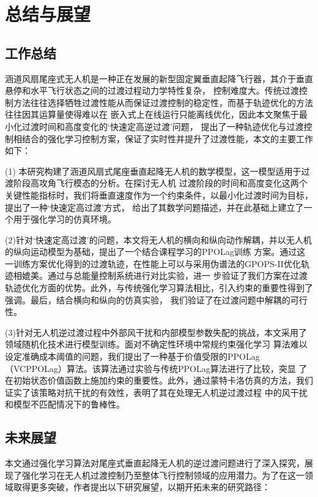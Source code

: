 \chapter{总结与展望}
\section{工作总结}
涵道风扇尾座式无人机是一种正在发展的新型固定翼垂直起降飞行器，其介于垂直悬停和水平飞行状态之间的过渡过程动力学特性复杂，
控制难度大。传统过渡控制方法往往选择牺牲过渡性能从而保证过渡控制的稳定性，而基于轨迹优化的方法往往因其运算量使得难以在
嵌入式上在线运行只能离线优化，因此本文聚焦于最小化过渡时间和高度变化的‘快速定高逆过渡’问题，
提出了一种轨迹优化与过渡控制相结合的强化学习控制方案，保证了实时性并提升了过渡性能，本文的主要工作如下：

(1) 本研究构建了涵道风扇式尾座垂直起降无人机的数学模型，这一模型适用于过渡阶段高攻角飞行模态的分析。在探讨无人机
过渡阶段的时间和高度变化这两个关键性能指标时，我们将垂直速度作为一个约束条件，以最小化过渡时间为目标，提出了一种‘快速定高过渡’方式，
给出了其数学问题描述，并在此基础上建立了一个用于强化学习的仿真环境。

(2)针对‘快速定高过渡’的问题，本文将无人机的横向和纵向动作解耦，并以无人机的纵向运动模型为基础，提出了一个结合课程学习的PPOLag训练
方案。通过这一训练方案优化得到的过渡轨迹，在性能上可以与采用伪谱法的GPOPS-II优化轨迹相媲美。通过与总能量控制系统进行对比实验，进一
步验证了我们方案在过渡轨迹优化方面的优势。此外，与传统强化学习算法相比，引入约束的重要性得到了强调。最后，结合横向和纵向的仿真实验，
我们验证了在过渡问题中解耦的可行性。

(3)针对无人机逆过渡过程中外部风干扰和内部模型参数失配的挑战，本文采用了领域随机化技术进行模型训练。面对不确定性环境中常规约束强化学习
算法难以设定准确成本阈值的问题，我们提出了一种基于价值受限的PPOLag（VCPPOLag）算法。该算法通过实验与传统PPOLag算法进行了比较，突显
了在初始状态价值函数上施加约束的重要性。此外，通过蒙特卡洛仿真的方法，我们证实了该策略对抗干扰的有效性，表明了其在处理无人机逆过渡过程
中的风干扰和模型不匹配情况下的鲁棒性。
    
    \section{未来展望}
    
    本文通过强化学习算法对尾座式垂直起降无人机的逆过渡问题进行了深入探究，展现了强化学习在无人机过渡控制乃至整体飞行控制领域的应用潜力。为了在这一领域取得更多突破，作者提出以下研究展望，以期开拓未来的研究路径：
    
